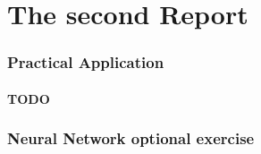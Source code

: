 \documentclass[subfigure,epsfig,fleqn,float,ausarbeitung]{scrartcl}
\begin{document}
\part{The second Report}
\label{cha:secondReport}

\section{Practical Application}

\subsection{TODO}

\section{Neural Network optional exercise}
\label{sec:neuralNetwork}



\pagebreak


\fontsize{9}{10pt}


\end{document}

